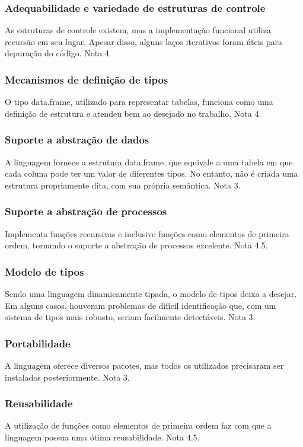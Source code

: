 \documentclass[rel_mlp]{iiufrgs}
\begin{document}
\subsubsection{Adequabilidade e variedade de estruturas de controle}
As estruturas de controle existem, mas a implementação funcional utiliza recursão em seu lugar. Apesar disso, alguns laços iterativos foram úteis para depuração do código. Nota 4.

\subsubsection{Mecanismos de definição de tipos}
O tipo data.frame, utilizado para representar tabelas, funciona como uma definição de estrutura e atendeu bem ao desejado no trabalho. Nota 4.

\subsubsection{Suporte a abstração de dados}
A linguagem fornece a estrutura data.frame, que equivale a uma tabela em que cada coluna pode ter um valor de diferentes tipos. No entanto, não é criada uma estrutura propriamente dita, com sua própria semântica. Nota 3.

\subsubsection{Suporte a abstração de processos}
Implementa funções recursivas e inclusive funções como elementos de primeira ordem, tornando o suporte a abstração de processos excelente. Nota 4.5.

\subsubsection{Modelo de tipos}
Sendo uma linguagem dinamicamente tipada, o modelo de tipos deixa a desejar. Em alguns casos, houveram problemas de difícil identificação que, com um sistema de tipos mais robusto, seriam facilmente detectáveis. Nota 3.

\subsubsection{Portabilidade}
A linguagem oferece diversos pacotes, mas todos os utilizados precisaram ser instalados posteriormente. Nota 3.

\subsubsection{Reusabilidade}
A utilização de funções como elementos de primeira ordem faz com que a linguagem possua uma ótima reusabilidade. Nota 4.5.
\end{document}
